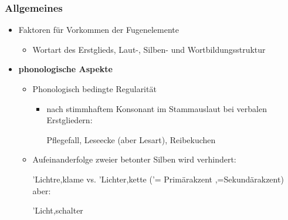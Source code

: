 \begin{frame}
\frametitle{Allgemeines}

\begin{itemize}
	\item Faktoren für Vorkommen der Fugenelemente
	
	\begin{itemize}
		\item Wortart des Erstglieds, Laut-, Silben- und Wortbildungsstruktur
	\end{itemize}
	\item \textbf{phonologische Aspekte}
	
	\begin{itemize}
		\item Phonologisch bedingte Regularität
		
		\begin{itemize}
			\item {} nach stimmhaftem Konsonant im Stammauslaut bei verbalen Erstgliedern:
			
			\ea Pflegefall, Leseecke (aber Lesart), Reibekuchen
			\z
			
		\end{itemize}
		
		\item Aufeinanderfolge zweier betonter Silben wird verhindert:
		
		\ea 'Lichtre,klame vs. 'Lichter,kette ('= Primärakzent ,=Sekundärakzent)
		\z
\\
		aber:
		
		\ea 'Licht,schalter	
		\z
			
	\end{itemize}
\end{itemize}


\end{frame}


